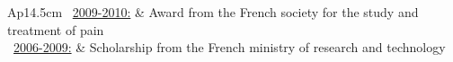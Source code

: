 \begin{tabular}{Ap{14.5cm}}
\textbullet~\underline{2009-2010:} & Award from the French society for the study and treatment of pain\\

\textbullet~\underline{2006-2009:} & Scholarship from the French ministry of research and technology \\
\end{tabular}
